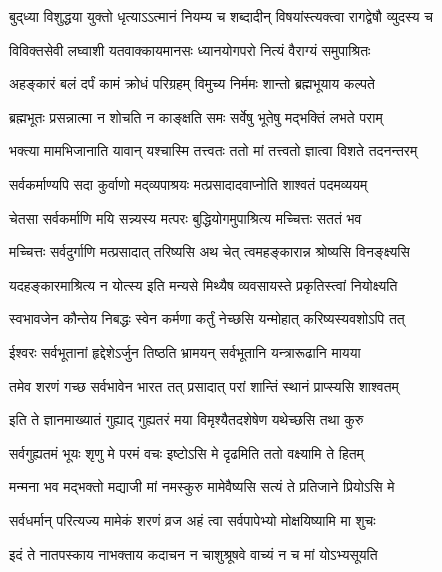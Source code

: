 \twolineshloka
{बुद्‌ध्या विशुद्धया युक्तो धृत्याऽऽत्मानं नियम्य च}
{शब्दादीन् विषयांस्त्यक्त्वा रागद्वेषौ व्युदस्य च}%

\twolineshloka
{विविक्तसेवी लघ्वाशी यतवाक्कायमानसः}
{ध्यानयोगपरो नित्यं वैराग्यं समुपाश्रितः}%

\twolineshloka
{अहङ्कारं बलं दर्पं कामं क्रोधं परिग्रहम्}
{विमुच्य निर्ममः शान्तो ब्रह्मभूयाय कल्पते}%

\twolineshloka
{ब्रह्मभूतः प्रसन्नात्मा न शोचति न काङ्क्षति}
{समः सर्वेषु भूतेषु मद्भक्तिं लभते पराम्}%

\twolineshloka
{भक्त्या मामभिजानाति यावान् यश्चास्मि तत्त्वतः}
{ततो मां तत्त्वतो ज्ञात्वा विशते तदनन्तरम्}%

\twolineshloka
{सर्वकर्माण्यपि सदा कुर्वाणो मद्‌व्यपाश्रयः}
{मत्प्रसादादवाप्नोति शाश्वतं पदमव्ययम्}%

\twolineshloka
{चेतसा सर्वकर्माणि मयि सन्न्यस्य मत्परः}
{बुद्धियोगमुपाश्रित्य मच्चित्तः सततं भव}%

\twolineshloka
{मच्चित्तः सर्वदुर्गाणि मत्प्रसादात् तरिष्यसि}
{अथ चेत् त्वमहङ्कारान्न श्रोष्यसि विनङ्क्ष्यसि}%

\twolineshloka
{यदहङ्कारमाश्रित्य न योत्स्य इति मन्यसे}
{मिथ्यैष व्यवसायस्ते प्रकृतिस्त्वां नियोक्ष्यति}%

\twolineshloka
{स्वभावजेन कौन्तेय निबद्धः स्वेन कर्मणा}
{कर्तुं नेच्छसि यन्मोहात् करिष्यस्यवशोऽपि तत्}%

\twolineshloka
{ईश्वरः सर्वभूतानां हृद्देशेऽर्जुन तिष्ठति}
{भ्रामयन् सर्वभूतानि यन्त्रारूढानि मायया}%

\twolineshloka
{तमेव शरणं गच्छ सर्वभावेन भारत}
{तत् प्रसादात् परां शान्तिं स्थानं प्राप्स्यसि शाश्वतम्}%

\twolineshloka
{इति ते ज्ञानमाख्यातं गुह्याद् गुह्यतरं मया}
{विमृश्यैतदशेषेण यथेच्छसि तथा कुरु}%

\twolineshloka
{सर्वगुह्यतमं भूयः शृणु मे परमं वचः}
{इष्टोऽसि मे दृढमिति ततो वक्ष्यामि ते हितम्}%

\twolineshloka
{मन्मना भव मद्भक्तो मद्याजी मां नमस्कुरु}
{मामेवैष्यसि सत्यं ते प्रतिजाने प्रियोऽसि मे}%

\twolineshloka
{सर्वधर्मान् परित्यज्य मामेकं शरणं व्रज}
{अहं त्वा सर्वपापेभ्यो मोक्षयिष्यामि मा शुचः}%

\twolineshloka
{इदं ते नातपस्काय नाभक्ताय कदाचन}
{न चाशुश्रूषवे वाच्यं न च मां योऽभ्यसूयति}%

